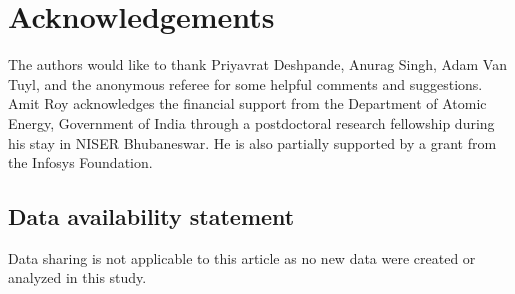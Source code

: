 \documentclass[12pt,reqno]{amsart}
\theoremstyle{definition}
\begin{document}
\section*{Acknowledgements} The authors would like to thank Priyavrat Deshpande, Anurag Singh, Adam Van Tuyl, and the anonymous referee for some helpful comments and suggestions. Amit Roy acknowledges the financial support from the Department of Atomic Energy, Government of India through a postdoctoral research fellowship during his stay in NISER Bhubaneswar. He is also partially supported by a grant from the Infosys Foundation.

\subsection*{Data availability statement} Data sharing is not applicable to this article as no new data were created or
analyzed in this study.
\end{document}
